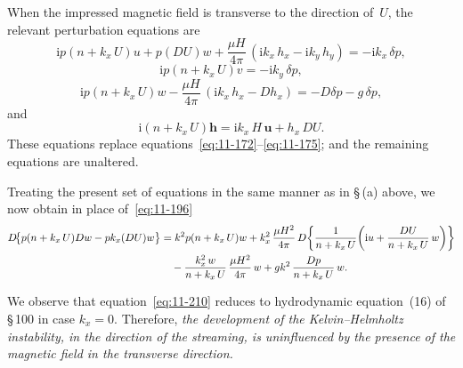 When the impressed magnetic field is transverse to the direction
of~$U$, the relevant perturbation equations are
\begin{equation}
\label{eq:11-206}
\mathrm{i}p(n+k_x\,U)u + p(DU)w
+ \frac{\mu H}{4\pi}\,(\mathrm{i}k_x\,h_x - \mathrm{i}k_y\,h_y)
= -\mathrm{i}k_x\,\delta p,
\end{equation}
\begin{equation}
\label{eq:11-207}
\mathrm{i}p(n+k_x\,U)v = -\mathrm{i}k_y\,\delta p,
\end{equation}
\begin{equation}
\label{eq:11-208}
\mathrm{i}p(n+k_x\,U)w
- \frac{\mu H}{4\pi}\,(\mathrm{i}k_x\,h_x - Dh_x)
= -D\delta p - g\,\delta p,
\end{equation}
and
\begin{equation}
\label{eq:11-209}
\mathrm{i}(n+k_x\,U)\mathbf{h}
= \mathrm{i}k_x\,H\,\mathbf{u} + h_x\,DU.
\end{equation}
These equations replace equations~\eqref{eq:11-172}--\eqref{eq:11-175};
and the remaining equations are unaltered.

Treating the present set of equations in the same manner as in
\S\,(a) above, we now obtain in place of~\eqref{eq:11-196}
\begin{align}
\label{eq:11-210}
D\!\bigl\{p(n+k_x\,U)Dw - pk_x(DU)w\bigr\}
&= k^{2}p(n+k_x\,U)w
  + k_x^{2}\,\frac{\mu H^{2}}{4\pi}\,
    D\!\left\{\frac{1}{n+k_x\,U}
      \!\left(\mathrm{i}u + \frac{DU}{n+k_x\,U}\,w\right)\right\}
\notag\\
&\quad
  - \frac{k_x^{2}\,w}{n+k_x\,U}\,\frac{\mu H^{2}}{4\pi}\,w
  + gk^{2}\,\frac{Dp}{n+k_x\,U}\,w.
\end{align}

We observe that equation~\eqref{eq:11-210} reduces to hydrodynamic
equation~(16) of \S\,100 in case $k_x=0$.  Therefore, \textit{the
development of the Kelvin--Helmholtz instability, in the direction of
the streaming, is uninfluenced by the presence of the magnetic field in
the transverse direction.}
